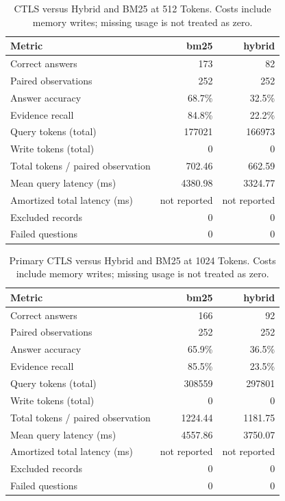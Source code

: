 \begin{table}[htbp]
\centering
\small
\caption{CTLS versus Hybrid and BM25 at 512 Tokens. Costs include memory writes; missing usage is not treated as zero.}
\label{tab:fair_baselines_512}
\begin{tabular}{lrr}
\toprule
Metric & bm25 & hybrid \\
\midrule
Correct answers & 173 & 82 \\
Paired observations & 252 & 252 \\
Answer accuracy & 68.7\% & 32.5\% \\
Evidence recall & 84.8\% & 22.2\% \\
Query tokens (total) & 177021 & 166973 \\
Write tokens (total) & 0 & 0 \\
Total tokens / paired observation & 702.46 & 662.59 \\
Mean query latency (ms) & 4380.98 & 3324.77 \\
Amortized total latency (ms) & not reported & not reported \\
Excluded records & 0 & 0 \\
Failed questions & 0 & 0 \\
\bottomrule
\end{tabular}
\end{table}

\begin{table}[htbp]
\centering
\small
\caption{Primary CTLS versus Hybrid and BM25 at 1024 Tokens. Costs include memory writes; missing usage is not treated as zero.}
\label{tab:fair_baselines}
\begin{tabular}{lrr}
\toprule
Metric & bm25 & hybrid \\
\midrule
Correct answers & 166 & 92 \\
Paired observations & 252 & 252 \\
Answer accuracy & 65.9\% & 36.5\% \\
Evidence recall & 85.5\% & 23.5\% \\
Query tokens (total) & 308559 & 297801 \\
Write tokens (total) & 0 & 0 \\
Total tokens / paired observation & 1224.44 & 1181.75 \\
Mean query latency (ms) & 4557.86 & 3750.07 \\
Amortized total latency (ms) & not reported & not reported \\
Excluded records & 0 & 0 \\
Failed questions & 0 & 0 \\
\bottomrule
\end{tabular}
\end{table}

